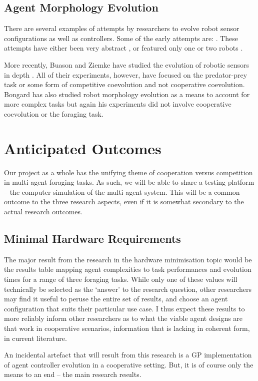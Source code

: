 \documentclass[a4paper,12pt]{article}
\begin{document}
\subsection{Agent Morphology Evolution}
There are several examples of attempts by researchers to evolve robot sensor configurations as well as controllers. Some of the early attempts are: \cite{Sims94,Balakrishnan96,Lee:1996}. These attempts have either been very abstract \cite{Balakrishnan96}, or featured only one or two robots \cite{Sims94}.

More recently, Buason and Ziemke have studied the evolution of robotic sensors in depth \cite{Buason:2003, Buason:2005}. All of their experiments, however, have focused on the predator-prey task or some form of competitive coevolution and not cooperative coevolution. Bongard has also studied robot morphology evolution as a means to account for more complex tasks \cite{Bongard:2009,Bongard:2010} but again his experiments did not involve cooperative coevolution or the foraging task.

\section{Anticipated Outcomes}
Our project as a whole has the unifying theme of cooperation versus competition in multi-agent foraging tasks. As such, we will be able to share a testing platform -- the computer simulation of the multi-agent system. This will be a common outcome to the three research aspects, even if it is somewhat secondary to the actual research outcomes.

\subsection{Minimal Hardware Requirements}
The major result from the research in the hardware minimisation topic would be the results table mapping agent complexities to task performances and evolution times for a range of three foraging tasks. While only one of these values will technically be selected as the ‘answer’ to the research question, other researchers may find it useful to peruse the entire set of results, and choose an agent configuration that suits their particular use case.
I thus expect these results to more reliably inform other researchers as to what the viable agent designs are that work in cooperative scenarios, information that is lacking in coherent form, in current literature.

An incidental artefact that will result from this research is a GP implementation of agent controller evolution in a cooperative setting. But, it is of course only the means to an end -- the main research results.
\end{document}
